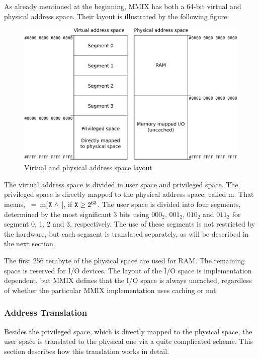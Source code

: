 As already mentioned at the beginning, MMIX has both a 64-bit virtual and physical address space. Their layout is illustrated by the following figure:
\begin{figure}[H]
	\centering
	\includegraphics[width=\textwidth]{img/address-spaces-crop.pdf}
	\caption{Virtual and physical address space layout \citep[pg. 35]{mmix-doc}}
\end{figure}
\noindent The virtual address space is divided in user space and privileged space. The privileged space is directly mapped to the physical address space, called m. That means, $~=~$m[${\tt X}~\land~$$]$, if ${\tt X} \ge 2^{63}$. The user space is divided into four segments, determined by the most significant 3 bits using $000_2$, $001_2$, $010_2$ and $011_2$ for segment 0, 1, 2 and 3, respectively. The use of these segments is not restricted by the hardware, but each segment is translated separately, as will be described in the next section.

The first 256 terabyte of the physical space are used for RAM. The remaining space is reserved for I/O devices. The layout of the I/O space is implementation dependent, but MMIX defines that the I/O space is always uncached, regardless of whether the particular MMIX implementation uses caching or not. \citep[pg. 35]{mmix-doc}

\subsubsection{Address Translation}

Besides the privileged space, which is directly mapped to the physical space, the user space is translated to the physical one via a quite complicated scheme. This section describes how this translation works in detail.

